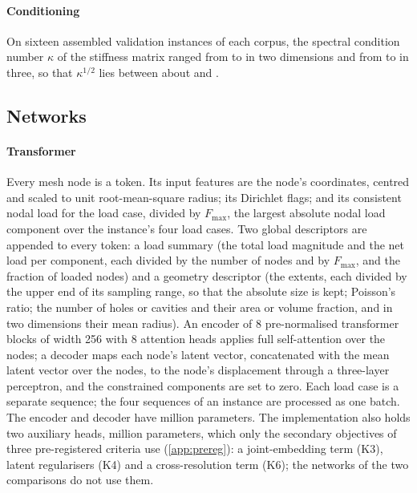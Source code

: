 \paragraph{Conditioning}
On sixteen assembled validation instances of each corpus, the spectral condition number
$\kappa$ of the stiffness matrix ranged from \numKappaTwoLow{} to \numKappaTwoHigh{} in two
dimensions and from \numKappaThreeLow{} to \numKappaThreeHigh{} in three, so that
$\kappa^{1/2}$ lies between about \numSqrtKappaMin{} and \numSqrtKappaMax{}.

\subsection{Networks}\label{sec:methods:networks}

\paragraph{Transformer}
Every mesh node is a token. Its input features are the node's coordinates, centred and
scaled to unit root-mean-square radius; its Dirichlet flags; and its consistent nodal load
for the load case, divided by $F_{\max}$, the largest absolute nodal load component over the
instance's four load cases. Two global descriptors are appended to every token: a load
summary (the total load magnitude and the net load per component, each divided by the number
of nodes and by $F_{\max}$, and the fraction of loaded nodes) and a geometry descriptor
(the extents, each divided by the upper end of its sampling range, so that the absolute
size is kept; Poisson's ratio; the number of holes or cavities and their area or
volume fraction, and in two dimensions their mean radius). An encoder of 8 pre-normalised
transformer blocks \cite{Vaswani2017} of width 256 with 8 attention heads applies full
self-attention over the nodes; a decoder maps each node's latent vector, concatenated with
the mean latent vector over the nodes, to the node's displacement through a three-layer
perceptron, and the constrained components are set to zero. Each load case is a separate
sequence; the four sequences of an instance are processed as one batch. The encoder and
decoder have \numParamsTransformer{} million parameters. The implementation also holds two
auxiliary heads, \numParamsAux{} million parameters, which only the secondary objectives of
three pre-registered criteria use (\ref{app:prereg}): a joint-embedding term (K3), latent
regularisers (K4) and a cross-resolution term (K6); the networks of the two comparisons do
not use them.

